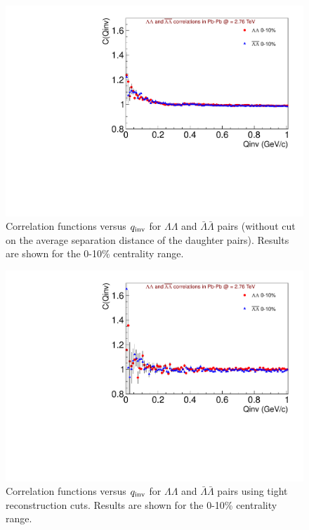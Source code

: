 \begin{figure}[hbtp]
\includegraphics[scale=0.7]{CFs_noMergeCut_note.pdf}
\caption[Correlation functions versus $q_{\rm inv}$ for $\Lambda\Lambda$ and $\bar{\Lambda}\bar{\Lambda}$ pairs. No merging cuts]{Correlation functions versus $q_{\rm inv}$ for $\Lambda\Lambda$ and $\bar{\Lambda}\bar{\Lambda}$ pairs (without cut on the average separation distance of the daughter pairs).  Results are shown for the 0-10\% centrality range.}
\label{fig:CFNoMerge}
\end{figure}

\begin{figure}[hbtp]
\includegraphics[scale=0.7]{CFs_tightcut_note.pdf}
\caption[Correlation functions versus $q_{\rm inv}$ for $\Lambda\Lambda$ and $\bar{\Lambda}\bar{\Lambda}$ pairs.  Tight cuts]{Correlation functions versus $q_{\rm inv}$ for $\Lambda\Lambda$ and $\bar{\Lambda}\bar{\Lambda}$ pairs using tight reconstruction cuts.  Results are shown for the 0-10\% centrality range.}
\label{fig:CFTightCuts}
\end{figure}

